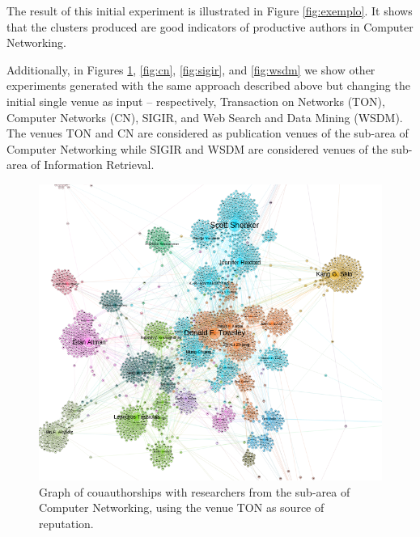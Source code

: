 \documentclass[msc]{ppgccufmg}
\begin{document}
\begin{appendices}
The result of this initial experiment is illustrated in Figure \ref{fig:exemplo}. It shows that the clusters produced are good indicators of productive authors in Computer Networking. 

Additionally, in Figures \ref{fig:ton}, \ref{fig:cn}, \ref{fig:sigir}, and \ref{fig:wsdm} we show other experiments generated with the same approach described above but changing the initial single venue as input -- respectively, Transaction on Networks (TON), Computer Networks (CN), SIGIR, and Web Search and Data Mining (WSDM). The venues TON and CN are considered as publication venues of the sub-area of Computer Networking while SIGIR and WSDM are considered venues of the sub-area of Information Retrieval.

\begin{figure}[h]
    \centering
    \includegraphics[scale=0.5]{fig/ton}
    \caption{Graph of couauthorships with researchers from the sub-area of Computer Networking, using the venue TON as source of reputation.}
    \label{fig:ton}
\end{figure}


\end{appendices}
\end{document}
